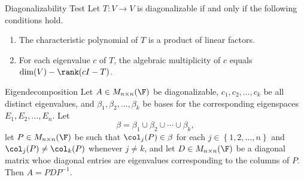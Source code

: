 \documentclass[linearalgebra]{subfiles}
\begin{document}
    \begin{prop}{Diagonalizability Test}
        Let $T:V\to V$ is diagonalizable if and only if the following conditions hold.
        \begin{enumerate}
            \item The characteristic polynomial of $T$ is a product of linear factors.
            \item For each eigenvalue $c$ of $T$, the algebraic multiplicity of $c$ equals $\dim(V)-\rank(cI-T)$.
        \end{enumerate}
    \end{prop}

    \clearpage
    \begin{prop}{Eigendecomposition}
        Let $A\in M_{n\times n}(\F)$ be diagonalizable, $c_1, c_2, \ldots, c_k$ be all distinct eigenvalues, and $\beta_1, \beta_2, \ldots, \beta_k$ be bases for the corresponding eigenspaces $E_1, E_2, \ldots, E_n$. Let
        \begin{equation*}
            \beta = \beta_1\cup\beta_2\cup\cdots\cup\beta_k,
        \end{equation*}
        let $P\in M_{n\times n}(\F)$ be such that $\col_j(P)\in \beta$ for each $j\in \left\lbrace 1, 2, \ldots, n \right\rbrace$ and $\col_j(P)\neq \col_k(P)$ whenever $j\neq k$, and let $D\in M_{n\times n}(\F)$ be a diagonal matrix whoe diagonal entries are eigenvalues corresponding to the columns of $P$. Then $A = PDP^{-1}$.
    \end{prop}
\end{document}
